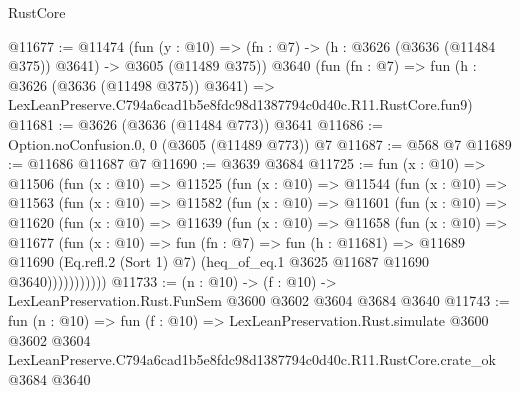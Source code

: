\begin{lexlean}{RustCore}
\begin{coremodule}
@11677 := @11474
    (fun (y : @10) => (fn : @7) -> (h : @3626 (@3636 (@11484 @375)) @3641) -> @3605 (@11489 @375))
    @3640
    (fun (fn : @7) =>
    fun (h : @3626 (@3636 (@11498 @375)) @3641) =>
    LexLeanPreserve.C794a6cad1b5e8fdc98d1387794c0d40c.R11.RustCore.fun9)
@11681 := @3626 (@3636 (@11484 @773)) @3641
@11686 := Option.noConfusion.{0, 0} (@3605 (@11489 @773)) @7
@11687 := @568 @7
@11689 := @11686 @11687 @7
@11690 := @3639 @3684
@11725 := fun (x : @10) =>
  @11506
    (fun (x : @10) =>
    @11525
      (fun (x : @10) =>
      @11544
        (fun (x : @10) =>
        @11563
          (fun (x : @10) =>
          @11582
            (fun (x : @10) =>
            @11601
              (fun (x : @10) =>
              @11620
                (fun (x : @10) =>
                @11639
                  (fun (x : @10) =>
                  @11658
                    (fun (x : @10) =>
                    @11677
                      (fun (x : @10) =>
                      fun (fn : @7) =>
                      fun (h : @11681) =>
                      @11689
                        @11690
                        (Eq.refl.{2} (Sort 1) @7)
                        (heq_of_eq.{1} @3625 @11687 @11690 @3640)))))))))))
@11733 := (n : @10) -> (f : @10) -> LexLeanPreservation.Rust.FunSem @3600 @3602 @3604 @3684 @3640
@11743 := fun (n : @10) =>
  fun (f : @10) =>
  LexLeanPreservation.Rust.simulate
    @3600
    @3602
    @3604
    LexLeanPreserve.C794a6cad1b5e8fdc98d1387794c0d40c.R11.RustCore.crate_ok
    @3684
    @3640
\end{coremodule}
\end{lexlean}

